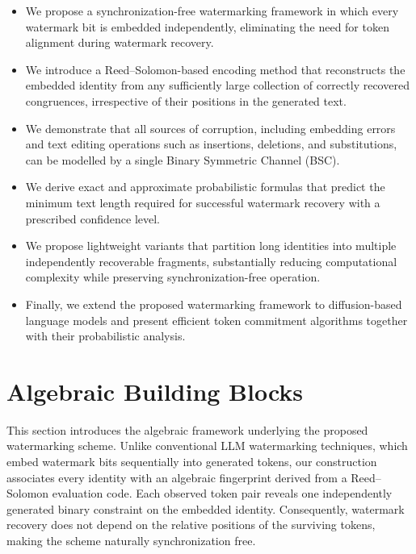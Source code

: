 \documentclass[a4paper,11pt]{llncs}
\begin{document}
\begin{itemize}
\item We propose a synchronization-free watermarking framework in which every watermark bit is embedded independently, eliminating the need for token alignment during watermark recovery.

\item We introduce a Reed--Solomon-based encoding method that reconstructs the embedded identity from any sufficiently large collection of correctly recovered congruences, irrespective of their positions in the generated text.

\item We demonstrate that all sources of corruption, including embedding errors and text editing operations such as insertions, deletions, and substitutions, can be modelled by a single Binary Symmetric Channel (BSC).

\item We derive exact and approximate probabilistic formulas that predict the minimum text length required for successful watermark recovery with a prescribed confidence level.

\item We propose lightweight variants that partition long identities into multiple independently recoverable fragments, substantially reducing computational complexity while preserving synchronization-free operation.

\item Finally, we extend the proposed watermarking framework to diffusion-based language models and present efficient token commitment algorithms together with their probabilistic analysis.
\end{itemize}

\section{Algebraic Building Blocks}
\label{sec:background}

This section introduces the algebraic framework underlying the proposed
watermarking scheme. Unlike conventional LLM watermarking techniques,
which embed watermark bits sequentially into generated tokens, our
construction associates every identity with an algebraic fingerprint
derived from a Reed--Solomon evaluation code. Each observed token pair
reveals one independently generated binary constraint on the embedded
identity. Consequently, watermark recovery does not depend on the
relative positions of the surviving tokens, making the scheme naturally
synchronization free.
\end{document}
